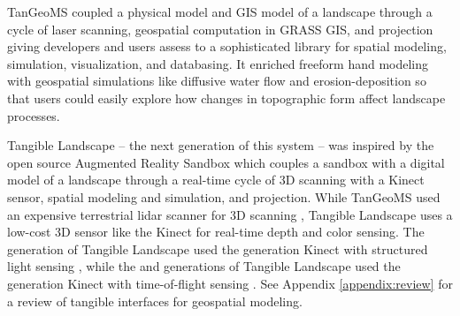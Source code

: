 \documentclass[prodmode,acmtochi]{acmsmall} %
\begin{document}
TanGeoMS coupled a physical model and GIS model of a landscape 
through a cycle of laser scanning, geospatial computation in GRASS GIS, and projection
giving developers and users assess to 
a sophisticated library for 
spatial modeling, simulation, visualization, and databasing.
%
It enriched freeform hand modeling with geospatial simulations like diffusive water flow and erosion-deposition 
so that users could easily explore how 
changes in topographic form affect landscape processes. 

Tangible Landscape -- the next generation of this system -- was inspired by
the open source Augmented Reality Sandbox \cite{Kreylos2012}
which couples a sandbox with a digital model of a landscape 
through a real-time cycle of 3D scanning with a Kinect sensor, spatial modeling and simulation, and projection.
%
While TanGeoMS used an expensive terrestrial lidar scanner for 3D scanning \cite{Tateosian2010}, 
Tangible Landscape uses a low-cost 3D sensor like the Kinect 
for real-time depth and color sensing. 
The  generation of Tangible Landscape \cite{Petrasova2014} 
used the  generation Kinect with structured light sensing \cite{Smisek2011}, 
while the   \cite{Petrasova2015} and  generations of Tangible Landscape 
used the  generation Kinect with time-of-flight sensing \cite{Bamji2015}. 
%
See Appendix \ref{appendix:review} for a review of tangible interfaces for geospatial modeling.
\end{document}
